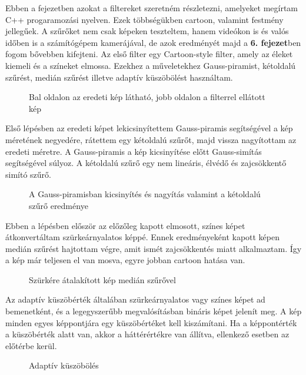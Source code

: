 
Ebben a fejezetben azokat a filtereket szeretném részletezni, amelyeket megírtam C++ progaramozási nyelven. Ezek többségükben cartoon, valamint festmény jellegűek. A szűrőket nem csak képeken teszteltem, hanem videókon is és valós időben is a számítógépem kamerájával, de azok eredményét majd a \textbf{6. fejezet}ben fogom bővebben kifejteni.
Az első filter egy Cartoon-style filter, amely az éleket kiemeli és a színeket elmossa. Ezekhez a műveletekhez Gauss-piramist, kétoldalú szűrést, medián szűrést illetve adaptív küszöbölést használtam.
\begin{figure}[ht]
\centering
{}
\caption{Bal oldalon az eredeti kép látható, jobb oldalon a filterrel ellátott kép} 
\label{fig: cartoon1}
\end{figure}
Első lépésben az eredeti képet lekicsinyítettem Gauss-piramis segítségével a kép méretének negyedére, rátettem egy kétoldalú szűrőt, majd vissza nagyítottam az eredeti méretre. A Gauss-piramis a kép kicsinyítése előtt Gauss-simítás segítségével súlyoz. A kétoldalú szűrő egy nem lineáris, élvédő és zajcsökkentő simító szűrő.
\begin{figure}[ht]
\centering
{}
\caption{A Gauss-piramisban kicsinyítés és nagyítás valamint a kétoldalú szűrő eredménye } 
\label{fig: cartoon2}
\end{figure}
Ebben a lépésben először az előzőleg kapott elmosott, színes képet átkonvertáltam szürkeárnyalatos képpé. Ennek eredményeként kapott képen medián szűrést hajtottam végre, amit ismét zajcsökkentés miatt alkalmaztam. Így a kép már teljesen el van mosva, egyre jobban cartoon hatása van.
\begin{figure}[ht]
\centering
{}
\caption{Szürkére átalakított kép medián szűrővel } 
\label{fig: cartoon3}
\end{figure}
Az adaptív küszöbérték általában szürkeárnyalatos vagy színes képet ad bemenetként, és a legegyszerűbb megvalósításban bináris képet jelenít meg. A kép minden egyes képpontjára egy küszöbértéket kell kiszámítani. Ha a képpontérték a küszöbérték alatt van, akkor a háttérértékre van állítva, ellenkező esetben az előtérbe kerül.
\begin{figure}[ht]
\centering
{}
\caption{Adaptív küszöbölés  } 
\label{fig: cartoon4}
\end{figure}
